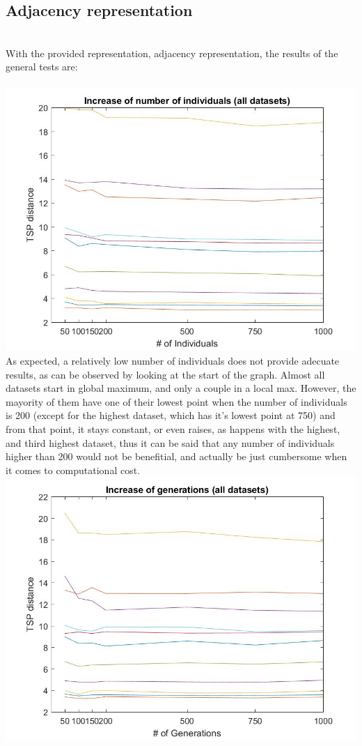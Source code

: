 \subsection{Adjacency representation}
\\
With the provided representation, adjacency representation, the results of the
general tests are:\\
\\
\includegraphics[width=\textwidth]{img/xalt_edges/numberIndiv.jpg}\\
As expected, a relatively low number of individuals does not provide adecuate
results, as can be observed by looking at the start of the graph. Almost
all datasets start in global maximum, and only a couple in a local max. However,
the mayority of them have one of their lowest point when the number of
individuals is 200 (except for the highest dataset, which has it's lowest
point at 750) and from that point, it stays constant, or even raises, as
happens with the highest, and third highest dataset, thus it can be said
that any number of individuals higher than 200 would not be benefitial, and
actually be just cumbersome when it comes to computational cost. 
\\
\includegraphics[width=\textwidth]{img/xalt_edges/numberGens.jpg}\\
